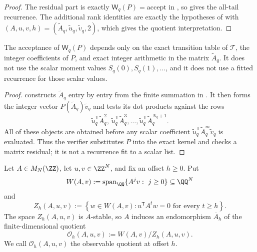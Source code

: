 \begin{proof}
The residual part is exactly \(\mathsf W_q(P)=\mathrm{accept}\) in
, so
 gives the all-tail recurrence.
The additional rank identities are exactly the hypotheses of
 with
\((A,u,v,h)=(\widetilde A_q,\widetilde u_q,\widetilde v_q,2)\), which gives the
quotient interpretation.
\end{proof}

\begin{lemma}
\label{lem:scalar-free-verifier}
The acceptance of \(\mathsf W_q(P)\) depends only on the exact transition table
of \(\mathcal T\), the integer coefficients of \(P\), and exact integer
arithmetic in the matrix \(\widetilde A_q\).  It does not use the scalar moment
values \(S_q(0),S_q(1),\dots\), and it does not use a fitted recurrence for
those scalar values.
\end{lemma}

\begin{proof}
 constructs \(\widetilde A_q\) entry by entry
from the finite summation in .  It then forms
the integer vector \(P(\widetilde A_q)\widetilde v_q\) and tests its dot
products against the rows
\[
  \widetilde u_q^{\mathsf T}\widetilde A_q^2,\,
  \widetilde u_q^{\mathsf T}\widetilde A_q^3,\dots,
  \widetilde u_q^{\mathsf T}\widetilde A_q^{N_q+1}.
\]
All of these objects are obtained before any scalar coefficient
\(\widetilde u_q^{\mathsf T}\widetilde A_q^m\widetilde v_q\) is evaluated.
Thus the verifier substitutes \(P\) into the exact kernel and checks a matrix
residual; it is not a recurrence fit to a scalar list.
\end{proof}

\begin{definition}
\label{def:observable-quotient}
Let \(A\in M_N(\ZZ)\), let \(u,v\in\ZZ^N\), and fix an offset \(h\ge0\).  Put
\[
  W(A,v):=\operatorname{span}_{\QQ}\{A^jv:\ j\ge0\}\subseteq\QQ^N
\]
and
\[
  Z_h(A,u,v):=
  \left\{
  w\in W(A,v):
  u^{\mathsf T}A^t w=0\text{ for every }t\ge h
  \right\}.
\]
The space \(Z_h(A,u,v)\) is \(A\)-stable, so \(A\) induces an endomorphism
\(\overline A_h\) of the finite-dimensional quotient
\[
  \mathcal O_h(A,u,v):=W(A,v)/Z_h(A,u,v).
\]
We call \(\mathcal O_h(A,u,v)\) the observable quotient at offset \(h\).
\end{definition}

